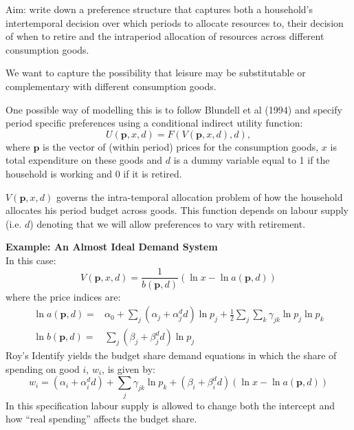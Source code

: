 \documentclass[12pt]{article}
\begin{document}
Aim: write down a preference structure that captures both a household's intertemporal decision over which periods to allocate resources to, their decision of when to retire and the intraperiod allocation of resources across different consumption goods. 

We want to capture the possibility that leisure may be substitutable or complementary with different consumption goods.

One possible way of modelling this is to follow Blundell et al (1994) and specify period specific preferences using a conditional indirect utility function:
\begin{equation*}
U(\mathbf{p},x,d)=F(V(\mathbf{p},x,d),d),
\end{equation*}
where $\mathbf{p}$ is the vector of (within period) prices for the consumption goods, $x$ is total expenditure on these goods and $d$ is a dummy variable equal to 1 if the household is working and 0 if it is retired.

$V(\mathbf{p},x,d)$ governs the intra-temporal allocation problem of how the household allocates his period budget across goods. This function depends on labour supply (i.e. $d$) denoting that we will allow preferences to vary with retirement.

\noindent \textbf{Example: An Almost Ideal Demand System}\\
In this case:
\begin{equation*}
V(\mathbf{p},x,d)=\frac{1}{b(\mathbf{p},d)}\left(\ln x-\ln a(\mathbf{p},d) \right)
\end{equation*}
where the price indices are:
\begin{align*}
\ln a(\mathbf{p},d) =& \alpha_0+\sum_j \left(\alpha_j+\alpha_j^d d \right)\ln p_j +\frac{1}{2}\sum_j \sum_k \gamma_{jk}\ln p_j \ln p_k\\
\ln b(\mathbf{p},d) =& \sum_j \left(\beta_j+\beta_j^d d \right) \ln p_j
\end{align*}
Roy's Identify yields the budget share demand equations in which the share of spending on good $i$, $w_i$, is given by:
\begin{equation*}
w_i=\left(\alpha_i+\alpha_i^d d \right)+\sum_j \gamma_{jk}\ln p_k + \left(\beta_i+\beta_i^d d \right)\left(\ln x-\ln a(\mathbf{p},d) \right)
\end{equation*}
In this specification labour supply is allowed to change both the intercept and how ``real spending'' affects the budget share.
\newline
\end{document}

